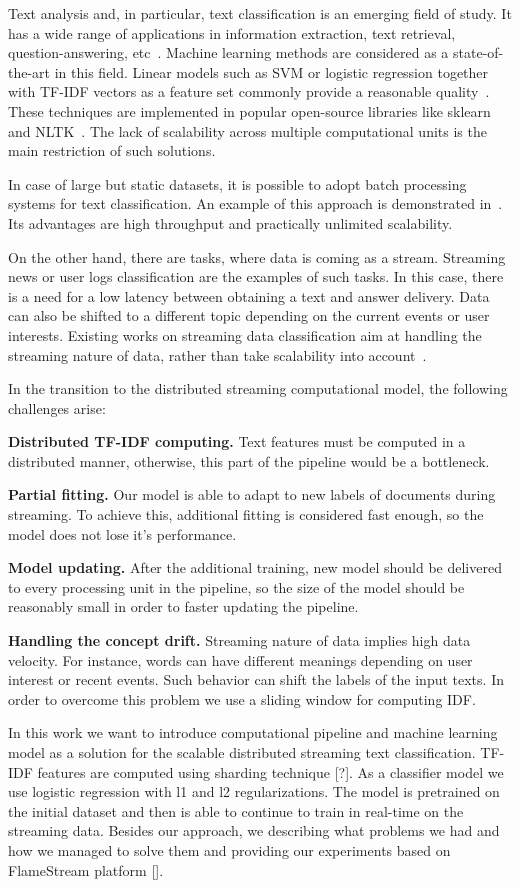 \label {fs-short-intro}

Text analysis and, in particular, text classification is an emerging field of study. It has a wide range of applications in information extraction, text retrieval, question-answering, etc~\cite{tampakas2005}. Machine learning methods are considered as a state-of-the-art in this field. Linear models such as SVM or logistic regression together with TF-IDF vectors as a feature set commonly provide a reasonable quality~\cite{???}. These techniques are implemented in popular open-source libraries like sklearn~\cite{sklearn_api} and NLTK~\cite{bird2009natural}. The lack of scalability across multiple computational units is the main restriction of such solutions.

In case of large but static datasets, it is possible to adopt batch processing systems for text classification. An example of this approach is demonstrated in~\cite{semberecki2016distributed}. Its advantages are high throughput and practically unlimited scalability.

On the other hand, there are tasks, where data is coming as a stream. Streaming news or user logs classification are the examples of such tasks. In this case, there is a need for a low latency between obtaining a text and answer delivery. Data can also be shifted to a different topic depending on the current events or user interests. Existing works on streaming data classification aim at handling the streaming nature of data, rather than take scalability into account~\cite{zhang2008one}.

In the transition to the distributed streaming computational model, the following challenges arise:

\textbf{Distributed TF-IDF computing.} Text features must be computed in a distributed manner, otherwise, this part of the pipeline would be a bottleneck.

\textbf{Partial fitting.} Our model is able to adapt to new labels of documents during streaming. To achieve this, additional fitting is considered fast enough, so the model does not lose it's performance.

\textbf{Model updating.} After the additional training, new model should be delivered to every processing unit in the pipeline, so the size of the model should be reasonably small in order to faster updating the pipeline.

\textbf{Handling the concept drift.} Streaming nature of data implies high data velocity. For instance, words can have different meanings depending on user interest or recent events. Such behavior can shift the labels of the input texts. In order to overcome this problem we use a sliding window for computing IDF.

In this work we want to introduce computational pipeline and machine learning model as a solution for the scalable distributed streaming text classification. TF-IDF features are computed using sharding technique [?]. As a classifier model we use logistic regression with l1 and l2 regularizations. The model is pretrained on the initial dataset and then is able to continue to train in real-time on the streaming data. Besides our approach, we describing what problems we had and how we managed to solve them and providing our experiments based on FlameStream platform [].
